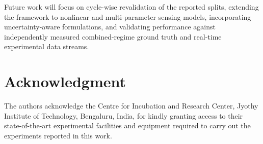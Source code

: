 \documentclass[journal,twoside,web]{ieeecolor}
\begin{document}
Future work will focus on cycle-wise revalidation of the reported splits,
extending the framework to nonlinear and multi-parameter sensing models,
incorporating uncertainty-aware formulations, and validating performance
against independently measured combined-regime ground truth and real-time
experimental data streams.




\section*{Acknowledgment}

The authors acknowledge the Centre for Incubation and Research Center,
Jyothy Institute of Technology, Bengaluru, India, for kindly granting access
to their state-of-the-art experimental facilities and equipment required to
carry out the experiments reported in this work.
\end{document}
